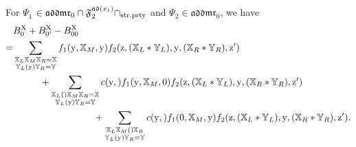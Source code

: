 \documentclass[15pt,oneside,reqno]{amsart}
\theoremstyle{remark}{
\newtheorem{lem}[df]{Lemma}
\newtheorem{prop}[df]{Proposition}
\newtheorem{ex}[df]{Example}
\newtheorem{rmk}[df]{Remark}
}
\newcommand{\addmr}{\mathfrak{addmr}}
\newcommand{\ad}{\mathfrak{ad}}
\newcommand{\Fad}{\mathfrak{F}_2^{\ad(x_1)}}
\let\x\relax
\newcommand{\x}{\mathrm{x}}
\newcommand{\y}{\mathrm{y}}
\newcommand{\z}{\mathrm{z}}
\let\Y\relax
\newcommand{\X}{\mathrm{X}}
\let\Y\relax
\newcommand{\Y}{\mathrm{Y}}
\let\V\relax
\newcommand{\V}{\mathrm{V}}
\newcommand{\strprty}{\mathrm{str.prty}}
\begin{document}
\begin{lem}\label{lem:Conv-harmonic-3}
For $\Psi_1$ $\in \addmr_0 \cap \Fad \cap \V_{\strprty}$ and $\Psi_2\in \addmr_0$, we have
\begin{align}
&B_{\Y0}^{\X} + B_{0\Y'}^{\X} - B_{00}^{\X} \notag  \\
=&\sum_{\substack{\mathbb{X}_L\mathbb{X}_M \mathbb{X}_R = \mathbb{X} \\ \mathbb{Y}_L(\y)\mathbb{Y}_R = \mathbb{Y}}} f_1(\y,\mathbb{X}_M,\y)f_2(\z,(\mathbb{X}_L * \mathbb{Y}_L),\y,(\mathbb{X}_R * \mathbb{Y}_R),\z') \notag \\
&\begin{aligned}
&\hspace{1cm}+\sum_{\substack{\mathbb{X}_L(\x)\mathbb{X}_M \mathbb{X}_R = \mathbb{X} \\ \mathbb{Y}_L(\y)\mathbb{Y}_R = \mathbb{Y}}} c(\y,\x) f_1(\y,\mathbb{X}_M,0)f_2(\z,(\mathbb{X}_L * \mathbb{Y}_L),\y,(\mathbb{X}_R * \mathbb{Y}_R),\z')\\
&\hspace{3cm}+\sum_{\substack{\mathbb{X}_L\mathbb{X}_M(\x) \mathbb{X}_R \\ \mathbb{Y}_L(\y)\mathbb{Y}_R = \mathbb{Y}}} c(\y,\x) f_1(0,\mathbb{X}_M,\y)f_2(\z,(\mathbb{X}_L * \mathbb{Y}_L),\y,(\mathbb{X}_R * \mathbb{Y}_R),\z'). \label{eq:Conv-harmonic-4}
\end{aligned}
\end{align}
\end{lem}
\end{document}
